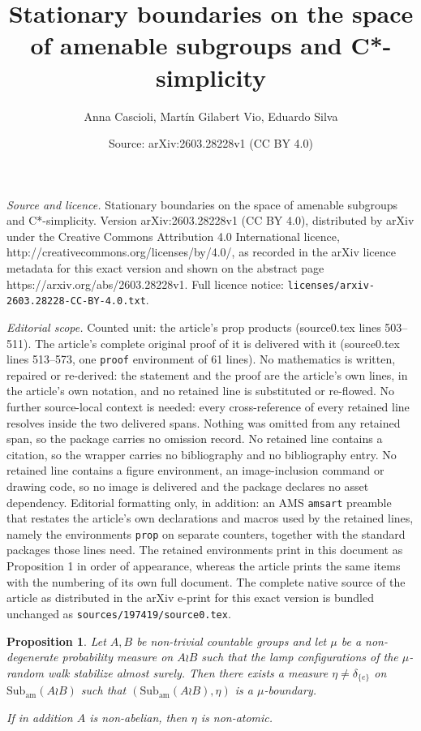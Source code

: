 \documentclass[10pt,a4paper]{amsart}
\title{Stationary boundaries on the space of amenable subgroups and C*-simplicity}
\author{Anna Cascioli, Mart\'in Gilabert Vio, Eduardo Silva}
\date{Source: arXiv:2603.28228v1 (CC BY 4.0)}
\newtheorem{prop}{Proposition}
\begin{document}
\maketitle

\noindent\emph{Source and licence.} Stationary boundaries on the space of amenable subgroups and C*-simplicity. Version arXiv:2603.28228v1 (CC BY 4.0), distributed by arXiv under the Creative Commons Attribution 4.0 International licence, http://creativecommons.org/licenses/by/4.0/, as recorded in the arXiv licence metadata for this exact version and shown on the abstract page https://arxiv.org/abs/2603.28228v1. Full licence notice: \texttt{licenses/arxiv-2603.28228-CC-BY-4.0.txt}.\par\smallskip

\noindent\textit{Editorial scope.} Counted unit: the article's prop products (source0.tex lines 503--511). The article's complete original proof of it is delivered with it (source0.tex lines 513--573, one \texttt{proof} environment of 61 lines). No mathematics is written, repaired or re-derived: the statement and the proof are the article's own lines, in the article's own notation, and no retained line is substituted or re-flowed.  No further source-local context is needed: every cross-reference of every retained line resolves inside the two delivered spans.  Nothing was omitted from any retained span, so the package carries no omission record.  No retained line contains a citation, so the wrapper carries no bibliography and no bibliography entry.  No retained line contains a figure environment, an image-inclusion command or drawing code, so no image is delivered and the package declares no asset dependency.  Editorial formatting only, in addition: an AMS \texttt{amsart} preamble that restates the article's own declarations and macros used by the retained lines, namely the environments \texttt{prop} on separate counters, together with the standard packages those lines need.  The retained environments print in this document as Proposition 1 in order of appearance, whereas the article prints the same items with the numbering of its own full document.  The complete native source of the article as distributed in the arXiv e-print for this exact version is bundled unchanged as \texttt{sources/197419/source0.tex}.
	\begin{prop}\label{prop: wreath products}
		Let $A,B$ be non-trivial countable groups and let $\mu$ be a non-degenerate
		probability measure on $A\wr B$ such that the lamp configurations of the
		$\mu$-random walk stabilize almost surely. Then there exists a measure
		$\eta \neq \delta_{\{e\}}$ on $\mathrm{Sub}_{\mathrm{am}}(A\wr B)$ such that
		$(\mathrm{Sub}_{\mathrm{am}}(A\wr B),\eta)$ is a $\mu$-boundary.
		
		If in addition $A$ is non-abelian, then $\eta$ is non-atomic.
	\end{prop}
\end{document}
